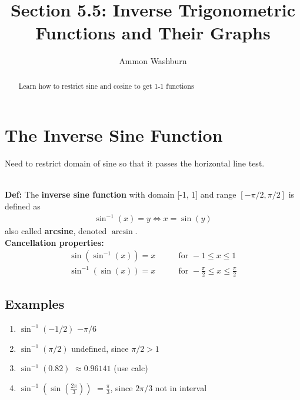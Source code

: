\documentclass{tufte-handout}
\title{Section 5.5: Inverse Trigonometric Functions and Their Graphs}
\author[AW]{Ammon Washburn}
\begin{document}
\begin{abstract}
Learn how to restrict sine and cosine to get 1-1 functions
\end{abstract}

\section{The Inverse Sine Function}
Need to restrict domain of sine so that it passes the horizontal line test. \\
 \\
\textbf{Def:} The \textbf{inverse sine function} with domain [-1, 1] and range $[-\pi/2, \pi/2]$ is defined as
\begin{align*}
\sin^{-1}(x) = y \Leftrightarrow x = \sin(y)
\end{align*}
also called \textbf{arcsine}, denoted $\arcsin$. \\
\textbf{Cancellation properties:} 
\begin{align*}
\sin(\sin^{-1}(x)) = x &\qquad\text{for } -1 \leq x \leq 1 \\
\sin^{-1}(\sin(x)) = x &\qquad\text{for } -\frac{\pi}{2} \leq x \leq \frac{\pi}{2}
\end{align*}

\subsection{Examples}
\begin{enumerate}
\item $\sin^{-1}(-1/2)$ {\color{blue} $-\pi/6$}
\item $\sin^{-1}(\pi/2)$ {\color{blue} undefined, since $\pi/2 > 1$}
\item $\sin^{-1}(0.82)$ {\color{blue} $\approx 0.96141$ (use calc)}
\item $\sin^{-1}\left( \sin\left(\frac{2\pi}{3} \right) \right)$ {\color{blue} $= \frac{\pi}{3}$, since $2\pi/3$ not in interval}
\end{enumerate}
\end{document}
